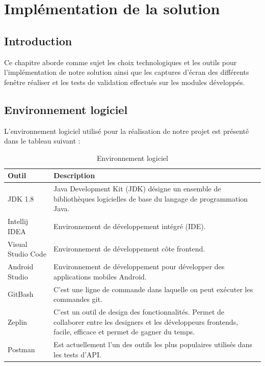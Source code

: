 \chapter{Impl\'ementation de la solution}

\section{Introduction}

Ce chapitre aborde comme sujet les choix technologiques et les outils pour l'impl\'ementation de notre solution ainsi que les captures d'\'ecran des diff\'erents fen\^etre r\'ealiser et les tests de validation effectu\'es sur les modules d\'evelopp\'es.

\section{Environnement logiciel}
L'environnement logiciel utilis\'e pour la r\'ealisation de notre projet est pr\'esent\'e dans le tableau suivant :

\begin{table}[H]
\begin{center}
\begin{tabularx}{\textwidth}{ |l|X| }
\hline Outil & Description \\\hline \hline
JDK 1.8 & Java Development Kit (JDK) d\'esigne un ensemble de biblioth\`eques logicielles de base du langage de programmation Java.\\ \hline
Intellij IDEA & Environnement de d\'eveloppement int\'egr\'e (IDE).\\ \hline
Visual Studio Code & Environnement de d\'eveloppement c\^ote frontend.\\ \hline
Android Studio & Environnement de d\'eveloppement pour d\'evelopper des applications mobiles Android.\\ \hline
GitBash & C'est une ligne de commande dans laquelle on peut ex\'ecuter les commandes git.\\ \hline
Zeplin & C'est un outil de design des fonctionnalit\'es. Permet de collaborer entre les designers et les d\'eveloppeurs frontends, facile, efficace et permet de gagner du temps.\\ \hline
Postman & Est actuellement l'un des outils les plus populaires utilis\'es dans les tests d'\gls{API}.\\
\hline
\end{tabularx}
\caption{Environnement logiciel}
\end{center}
\end{table}

